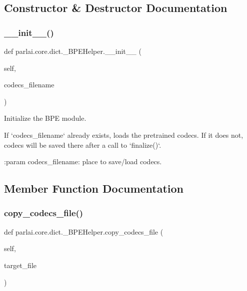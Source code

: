 \subsection{Constructor \& Destructor Documentation}
\mbox{\label{classparlai_1_1core_1_1dict_1_1__BPEHelper_a449da91d98a6bb75bc374782cf9f7016}} 
\subsubsection{\texorpdfstring{\+\_\+\+\_\+init\+\_\+\+\_\+()}{\_\_init\_\_()}}
{\footnotesize\ttfamily def parlai.\+core.\+dict.\+\_\+\+B\+P\+E\+Helper.\+\_\+\+\_\+init\+\_\+\+\_\+ (\begin{DoxyParamCaption}\item[{}]{self,  }\item[{}]{codecs\+\_\+filename }\end{DoxyParamCaption})}

\begin{DoxyVerb}Initialize the BPE module.

If `codecs_filename` already exists, loads the pretrained codecs.
If it does not, codecs will be saved there after a call to `finalize()`.

:param codecs_filename:
    place to save/load codecs.
\end{DoxyVerb}
 

\subsection{Member Function Documentation}
\mbox{\label{classparlai_1_1core_1_1dict_1_1__BPEHelper_a712c4482ea0dc907543effce64bd8145}} 
\subsubsection{\texorpdfstring{copy\+\_\+codecs\+\_\+file()}{copy\_codecs\_file()}}
{\footnotesize\ttfamily def parlai.\+core.\+dict.\+\_\+\+B\+P\+E\+Helper.\+copy\+\_\+codecs\+\_\+file (\begin{DoxyParamCaption}\item[{}]{self,  }\item[{}]{target\+\_\+file }\end{DoxyParamCaption})}

